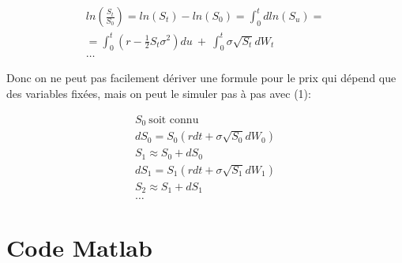 \documentclass[a4paper,12pt]{scrartcl}
\begin{document}
\begin{equation} \label{5}
\begin{multlined}
ln( \frac{S_t}{S_0} ) = ln(S_t)-ln(S_0) = \int_0^t dln(S_u) = \\
= \int_0^t (r-\frac{1}{2} S_t \sigma^2)du~+~\int_0^t \sigma \sqrt{S_t}dW_t \\
\dots
\end{multlined}
\end{equation}

Donc on ne peut pas facilement dériver une formule pour le prix qui dépend que des variables fixées, mais on peut le simuler pas à pas avec (1):

\begin{equation} \label{6}
\begin{multlined}
S_0 ~\text{soit connu} \\
dS_0 = S_0(rdt + \sigma \sqrt{S_0} dW_0) \\
S_1 \approx S_0 + dS_0 \\
dS_1 = S_1(rdt + \sigma \sqrt{S_1} dW_1) \\
S_2 \approx S_1 + dS_1 \\
\dots
\end{multlined}
\end{equation}







\appendix
\appendixpage
\addappheadtotoc

\section{Code Matlab}

\end{document}

